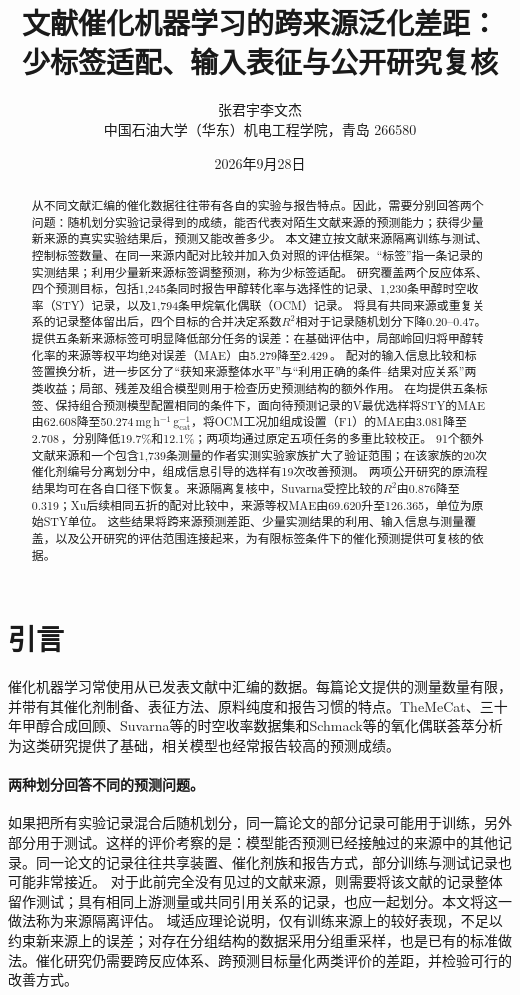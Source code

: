 \documentclass[11pt,a4paper]{article}
\title{\textbf{文献催化机器学习的跨来源泛化差距：\\
少标签适配、输入表征与公开研究复核}}
\author{张君宇\quad 李文杰\\[2pt]
\small 中国石油大学（华东）机电工程学院，青岛 266580}
\date{2026年9月28日}
\newcommand{\pp}{\,\text{个百分点}}
\newcommand{\mgg}{\,mg\,h$^{-1}$\,g$_{\mathrm{cat}}^{-1}$}
\begin{document}
\maketitle
\begin{abstract}
\noindent
从不同文献汇编的催化数据往往带有各自的实验与报告特点。因此，需要分别回答两个问题：随机划分实验记录得到的成绩，能否代表对陌生文献来源的预测能力；获得少量新来源的真实实验结果后，预测又能改善多少。
本文建立按文献来源隔离训练与测试、控制标签数量、在同一来源内配对比较并加入负对照的评估框架。“标签”指一条记录的实测结果；利用少量新来源标签调整预测，称为少标签适配。
研究覆盖两个反应体系、四个预测目标，包括1,245条同时报告甲醇转化率与选择性的记录、1,230条甲醇时空收率（STY）记录，以及1,794条甲烷氧化偶联（OCM）记录。
将具有共同来源或重复关系的记录整体留出后，四个目标的合并决定系数$R^2$相对于记录随机划分下降0.20--0.47。
提供五条新来源标签可明显降低部分任务的误差：在基础评估中，局部岭回归将甲醇转化率的来源等权平均绝对误差（MAE）由5.279降至2.429\pp{}。
配对的输入信息比较和标签置换分析，进一步区分了“获知来源整体水平”与“利用正确的条件--结果对应关系”两类收益；局部、残差及组合模型则用于检查历史预测结构的额外作用。
在均提供五条标签、保持组合预测模型配置相同的条件下，面向待预测记录的V最优选样将STY的MAE由62.608降至50.274\mgg{}，将OCM工况加组成设置（F1）的MAE由3.081降至2.708\pp{}，分别降低19.7\%和12.1\%；两项均通过原定五项任务的多重比较校正。
91个额外文献来源和一个包含1,739条测量的作者实测实验家族扩大了验证范围；在该家族的20次催化剂编号分离划分中，组成信息引导的选样有19次改善预测。
两项公开研究的原流程结果均可在各自口径下恢复。来源隔离复核中，Suvarna受控比较的$R^2$由0.876降至0.319；Xu后续相同五折的配对比较中，来源等权MAE由69.620升至126.365，单位为原始STY单位。
这些结果将跨来源预测差距、少量实测结果的利用、输入信息与测量覆盖，以及公开研究的评估范围连接起来，为有限标签条件下的催化预测提供可复核的依据。
\end{abstract}

\section{引言}
催化机器学习常使用从已发表文献中汇编的数据。每篇论文提供的测量数量有限，并带有其催化剂制备、表征方法、原料纯度和报告习惯的特点。TheMeCat\cite{toldy}、三十年甲醇合成回顾\cite{yan}、Suvarna等的时空收率数据集\cite{suvarna}和Schmack等的氧化偶联荟萃分析\cite{schmack}为这类研究提供了基础，相关模型也经常报告较高的预测成绩。

\paragraph{两种划分回答不同的预测问题。}
如果把所有实验记录混合后随机划分，同一篇论文的部分记录可能用于训练，另外部分用于测试。这样的评价考察的是：模型能否预测已经接触过的来源中的其他记录。同一论文的记录往往共享装置、催化剂族和报告方式，部分训练与测试记录也可能非常接近。
对于此前完全没有见过的文献来源，则需要将该文献的记录整体留作测试；具有相同上游测量或共同引用关系的记录，也应一起划分。本文将这一做法称为来源隔离评估。
域适应理论说明，仅有训练来源上的较好表现，不足以约束新来源上的误差\cite{bendavid}；对存在分组结构的数据采用分组重采样，也是已有的标准做法\cite{roberts}。催化研究仍需要跨反应体系、跨预测目标量化两类评价的差距，并检验可行的改善方式。
\end{document}
